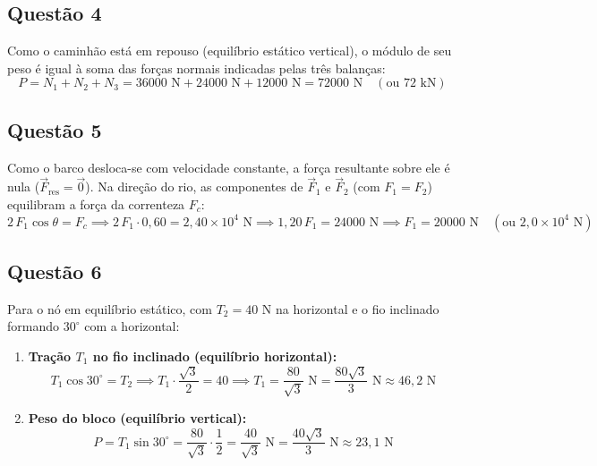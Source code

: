 \documentclass[11pt, a4paper]{article}
\begin{document}
\subsection*{Questão 4}
Como o caminhão está em repouso (equilíbrio estático vertical), o módulo de seu peso é igual à soma das forças normais indicadas pelas três balanças:
\[
    P = N_1 + N_2 + N_3 = 36000\text{ N} + 24000\text{ N} + 12000\text{ N} = 72000\text{ N} \quad (\text{ou } 72\text{ kN})
\]

\subsection*{Questão 5}
Como o barco desloca-se com velocidade constante, a força resultante sobre ele é nula ($\vec{F}_{\text{res}} = \vec{0}$). Na direção do rio, as componentes de $\vec{F}_1$ e $\vec{F}_2$ (com $F_1 = F_2$) equilibram a força da correnteza $F_c$:
\[
    2\,F_1 \cos\theta = F_c \implies 2\,F_1 \cdot 0{,}60 = 2{,}40 \times 10^4\text{ N} \implies 1{,}20\,F_1 = 24000\text{ N} \implies F_1 = 20000\text{ N} \quad (\text{ou } 2{,}0 \times 10^4\text{ N})
\]

\subsection*{Questão 6}
Para o nó em equilíbrio estático, com $T_2 = 40\text{ N}$ na horizontal e o fio inclinado formando $30^\circ$ com a horizontal:

\begin{enumerate}[label=\textbf{(\alph*)}]
    \item \textbf{Tração $T_1$ no fio inclinado (equilíbrio horizontal):}
    \[
        T_1 \cos 30^\circ = T_2 \implies T_1 \cdot \frac{\sqrt{3}}{2} = 40 \implies T_1 = \frac{80}{\sqrt{3}}\text{ N} = \frac{80\sqrt{3}}{3}\text{ N} \approx 46{,}2\text{ N}
    \]

    \item \textbf{Peso do bloco (equilíbrio vertical):}
    \[
        P = T_1 \sin 30^\circ = \frac{80}{\sqrt{3}} \cdot \frac{1}{2} = \frac{40}{\sqrt{3}}\text{ N} = \frac{40\sqrt{3}}{3}\text{ N} \approx 23{,}1\text{ N}
    \]
\end{enumerate}
\end{document}
